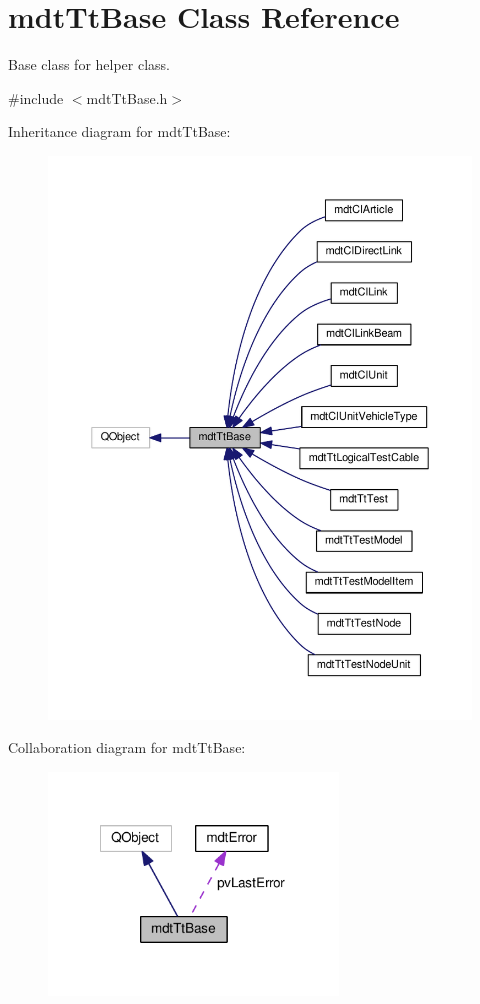 \hypertarget{classmdt_tt_base}{\section{mdt\-Tt\-Base Class Reference}
\label{classmdt_tt_base}
}


Base class for helper class.  




{\ttfamily \#include $<$mdt\-Tt\-Base.\-h$>$}



Inheritance diagram for mdt\-Tt\-Base\-:
\nopagebreak
\begin{figure}[H]
\begin{center}
\leavevmode
\includegraphics[width=350pt]{classmdt_tt_base__inherit__graph}
\end{center}
\end{figure}


Collaboration diagram for mdt\-Tt\-Base\-:
\nopagebreak
\begin{figure}[H]
\begin{center}
\leavevmode
\includegraphics[width=218pt]{classmdt_tt_base__coll__graph}
\end{center}
\end{figure}
